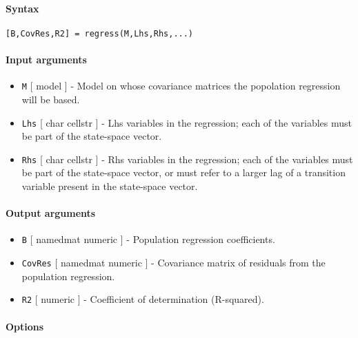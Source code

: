 


	\paragraph{Syntax}

\begin{verbatim}
[B,CovRes,R2] = regress(M,Lhs,Rhs,...)
\end{verbatim}

\paragraph{Input arguments}

\begin{itemize}
\item
  \texttt{M} {[} model {]} - Model on whose covariance matrices the
  popolation regression will be based.
\item
  \texttt{Lhs} {[} char \textbar{} cellstr {]} - Lhs variables in the
  regression; each of the variables must be part of the state-space
  vector.
\item
  \texttt{Rhs} {[} char \textbar{} cellstr {]} - Rhs variables in the
  regression; each of the variables must be part of the state-space
  vector, or must refer to a larger lag of a transition variable present
  in the state-space vector.
\end{itemize}

\paragraph{Output arguments}

\begin{itemize}
\item
  \texttt{B} {[} namedmat \textbar{} numeric {]} - Population regression
  coefficients.
\item
  \texttt{CovRes} {[} namedmat \textbar{} numeric {]} - Covariance
  matrix of residuals from the population regression.
\item
  \texttt{R2} {[} numeric {]} - Coefficient of determination
  (R-squared).
\end{itemize}

\paragraph{Options}

